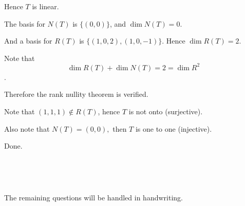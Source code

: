 \documentclass[12pt]{article}%
\begin{document}
Hence $T$ is linear. 

The basis for $N(T)$ is $\{(0,0)\}$, and $\dim{N(T)}=0.$ 

And a basis for $R(T)$ is $\{(1,0,2),(1,0,-1)\}.$ Hence $\dim{R(T)}=2.$

Note that $$\dim{R(T)}+\dim{N(T)}=2=\dim{R^2}$$. 

Therefore the rank nullity theorem is verified. 

Note that $(1,1,1) \notin R(T)$, hence $T$ is not onto (surjective). 

Also note that $N(T)={(0,0)},$ then $T$ is one to one (injective). 

Done. 

~ \ 




~ \ 


The remaining questions will be handled in handwriting. 
\end{document}
